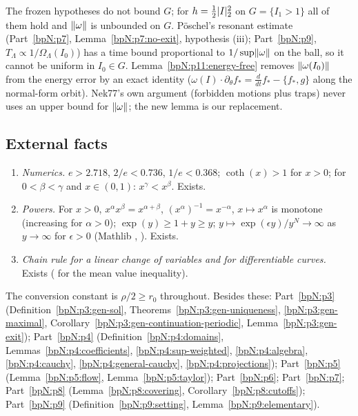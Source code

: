 \begin{remark}\label{bpN:p11:omega-unbounded}
The frozen hypotheses do not bound $G$; for $h=\frac12\lvert I\rvert_2^2$ on $G=\{I_1>1\}$ all of them hold and $\lVert \omega\rVert$ is unbounded on $G$. P\"oschel's resonant estimate (Part~\ref{bpN:p7}, Lemma~\ref{bpN:p7:no-exit}, hypothesis (iii); Part~\ref{bpN:p9}, $T_\Lambda\propto1/\Omega_\Lambda(I_0)$) has a time bound proportional to $1/\sup\lVert \omega\rVert$ on the ball, so it cannot be uniform in $I_0\in G$. Lemma~\ref{bpN:p11:energy-free} removes $\lVert \omega(I_0)\rVert$ from the energy error by an exact identity ($\omega(I)\cdot\partial_\theta f_*=\frac d{dt}f_*-\{f_*,g\}$ along the normal-form orbit). Nek77's own argument (forbidden motions plus traps) never uses an upper bound for $\lVert \omega\rVert$; the new lemma is our replacement. 
\end{remark}

\subsection{External facts}\label{bpN:p11:s-ext}
\begin{enumerate}[label=(E\arabic*),leftmargin=2.2em]
\item\label{bpN:p11:ext-num} \emph{Numerics.} $e>2.718$, $2/e<0.736$, $1/e<0.368$; $\coth(x)>1$ for $x>0$; for $0<\beta<\gamma$ and $x\in(0,1)$: $x^{\gamma}<x^{\beta}$. Exists.
\item\label{bpN:p11:ext-rpow} \emph{Powers.} For $x>0$, $x^{\alpha}x^{\beta}=x^{\alpha+\beta}$, $(x^\alpha)^{-1}=x^{-\alpha}$, $x\mapsto x^{\alpha}$ is monotone (increasing for $\alpha>0$); $\exp(y)\ge1+y\ge y$; $y\mapsto\exp(\epsilon y)/y^{N}\to\infty$ as $y\to\infty$ for $\epsilon>0$ (Mathlib , ). Exists.
\item\label{bpN:p11:ext-chain} \emph{Chain rule for a linear change of variables and for differentiable curves.} Exists ( for the mean value inequality).
\end{enumerate}
The conversion constant is $\rho/2\ge r_0$ throughout. Besides these: Part~\ref{bpN:p3} (Definition~\ref{bpN:p3:gen-sol}, Theorems~\ref{bpN:p3:gen-uniqueness}, \ref{bpN:p3:gen-maximal}, Corollary~\ref{bpN:p3:gen-continuation-periodic}, Lemma~\ref{bpN:p3:gen-exit}); Part~\ref{bpN:p4} (Definition~\ref{bpN:p4:domains}, Lemmas~\ref{bpN:p4:coefficients}, \ref{bpN:p4:sup-weighted}, \ref{bpN:p4:algebra}, \ref{bpN:p4:cauchy}, \ref{bpN:p4:general-cauchy}, \ref{bpN:p4:projections}); Part~\ref{bpN:p5} (Lemma~\ref{bpN:p5:flow}, Lemma~\ref{bpN:p5:taylor}); Part~\ref{bpN:p6}; Part~\ref{bpN:p7}; Part~\ref{bpN:p8} (Lemma~\ref{bpN:p8:covering}, Corollary~\ref{bpN:p8:cutoffs}); Part~\ref{bpN:p9} (Definition~\ref{bpN:p9:setting}, Lemma~\ref{bpN:p9:elementary}).


